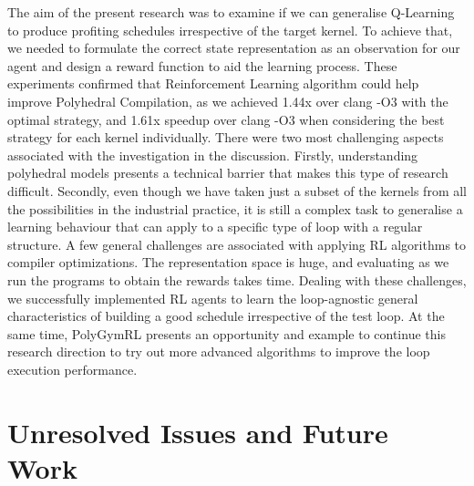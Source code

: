 \documentclass[logo,msc]{infthesis}           %
\begin{document}
The aim of the present research was to examine if we can generalise Q-Learning to produce profiting schedules irrespective of the target kernel. To achieve that, we needed to formulate the correct state representation as an observation for our agent and design a reward function to aid the learning process. These experiments confirmed that Reinforcement Learning algorithm could help improve Polyhedral Compilation, as we achieved 1.44x over clang -O3 with the optimal strategy, and 1.61x speedup over clang -O3 when considering the best strategy for each kernel individually. There were two most challenging aspects associated with the investigation in the discussion. Firstly, understanding polyhedral models presents a technical barrier that makes this type of research difficult. Secondly, even though we have taken just a subset of the kernels from all the possibilities in the industrial practice, it is still a complex task to generalise a learning behaviour that can apply to a specific type of loop with a regular structure. A few general challenges are associated with applying RL algorithms to compiler optimizations. The representation space is huge, and evaluating as we run the programs to obtain the rewards takes time. Dealing with these challenges, we successfully implemented RL agents to learn the loop-agnostic general characteristics of building a good schedule irrespective of the test loop. At the same time, PolyGymRL presents an opportunity and example to continue this research direction to try out more advanced algorithms to improve the loop execution performance.

\section{Unresolved Issues and Future Work}
\end{document}
